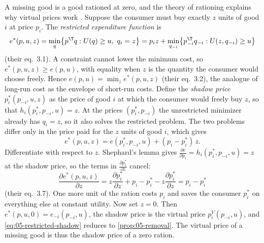 A missing good is a good rationed at zero, and the theory of rationing explains why virtual prices work
\citep[\S 4.3, pp.~109--113]{DeatonMuellbauer1980b}. Suppose the consumer must buy exactly $z$ units of
good $i$ at price $p_i$. The \emph{restricted expenditure function} is
\begin{equation}\label{eq:05-restricted-e}
  e^*(p, u, z) = \min_q\bigl\{p^\T q : U(q) \ge u,\ q_i = z\bigr\}
             = p_iz + \min_{q_{-i}}\bigl\{p_{-i}^\T q_{-i} : U(z, q_{-i}) \ge u\bigr\}
\end{equation}
(their eq.~3.1). A constraint cannot lower the minimum cost, so $e^*(p, u, z) \ge e(p, u)$, with equality
when $z$ is the quantity the consumer would choose freely. Hence $e(p, u) = \min_z e^*(p, u, z)$ (their
eq.~3.2), the analogue of long-run cost as the envelope of short-run costs. Define the \emph{shadow
price} $p_i^*(p_{-i}, u, z)$ as the price of good $i$ at which the consumer would freely buy $z$, so that
$h_i(p_i^*, p_{-i}, u) = z$. At the prices $(p_i^*, p_{-i})$ the unrestricted minimizer already has $q_i =
z$, so it also solves the restricted problem. The two problems differ only in the price paid for the $z$
units of good $i$, which gives
\begin{equation}\label{eq:05-restricted-shadow}
  e^*(p, u, z) = e(p_i^*, p_{-i}, u) + (p_i - p_i^*)\,z .
\end{equation}
Differentiate with respect to $z$. Shephard's lemma gives $\frac{\partial e}{\partial p_i} = h_i(p_i^*,
p_{-i}, u) = z$ at the shadow price, so the terms in $\frac{\partial p_i^*}{\partial z}$ cancel:
\begin{equation}\label{eq:05-shadow}
  \frac{\partial e^*(p, u, z)}{\partial z} = z\frac{\partial p_i^*}{\partial z} + p_i - p_i^*
     - z\frac{\partial p_i^*}{\partial z} = p_i - p_i^*
\end{equation}
(their eq.~3.7). One more unit of the ration costs $p_i$ and saves the consumer $p_i^*$ on everything
else at constant utility. Now set $z = 0$. Then $e^*(p, u, 0) = e_{-i}(p_{-i}, u)$, the shadow price is
the virtual price $p_i^V(p_{-i}, u)$, and \eqref{eq:05-restricted-shadow} reduces to
\cref{prop:05-removal}. The virtual price of a missing good is thus the shadow price of a zero ration.

